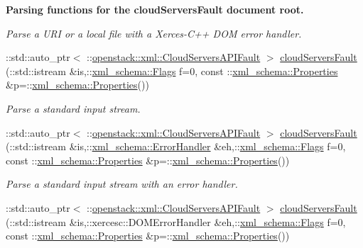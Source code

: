 \begin{Indent}{\bf Parsing functions for the cloudServersFault document root.}
\begin{DoxyCompactItemize}
\begin{DoxyCompactList}\small\item\em Parse a URI or a local file with a Xerces-\/C++ DOM error handler. \item\end{DoxyCompactList}\item 
::std::auto\_\-ptr$<$ ::\hyperlink{classopenstack_1_1xml_1_1CloudServersAPIFault}{openstack::xml::CloudServersAPIFault} $>$ \hyperlink{namespaceopenstack_1_1xml_a111c5cf6fea4d40a87875c2d8cc234f1}{cloudServersFault} (::std::istream \&is,::\hyperlink{namespacexml__schema_affb4c227cbd9aa7453dd1dc5a1401943}{xml\_\-schema::Flags} f=0, const ::\hyperlink{namespacexml__schema_ad27ce19a7ee1d3b1064092648898f64c}{xml\_\-schema::Properties} \&p=::\hyperlink{namespacexml__schema_ad27ce19a7ee1d3b1064092648898f64c}{xml\_\-schema::Properties}())
\begin{DoxyCompactList}\small\item\em Parse a standard input stream. \item\end{DoxyCompactList}\item 
::std::auto\_\-ptr$<$ ::\hyperlink{classopenstack_1_1xml_1_1CloudServersAPIFault}{openstack::xml::CloudServersAPIFault} $>$ \hyperlink{namespaceopenstack_1_1xml_a230d02d53deb3a8712f67f44f72def1c}{cloudServersFault} (::std::istream \&is,::\hyperlink{namespacexml__schema_ab1c9361bfd3b404eaabf0c31eded79dc}{xml\_\-schema::ErrorHandler} \&eh,::\hyperlink{namespacexml__schema_affb4c227cbd9aa7453dd1dc5a1401943}{xml\_\-schema::Flags} f=0, const ::\hyperlink{namespacexml__schema_ad27ce19a7ee1d3b1064092648898f64c}{xml\_\-schema::Properties} \&p=::\hyperlink{namespacexml__schema_ad27ce19a7ee1d3b1064092648898f64c}{xml\_\-schema::Properties}())
\begin{DoxyCompactList}\small\item\em Parse a standard input stream with an error handler. \item\end{DoxyCompactList}\item 
::std::auto\_\-ptr$<$ ::\hyperlink{classopenstack_1_1xml_1_1CloudServersAPIFault}{openstack::xml::CloudServersAPIFault} $>$ \hyperlink{namespaceopenstack_1_1xml_a11859017418614472cc3e93af301c76b}{cloudServersFault} (::std::istream \&is,::xercesc::DOMErrorHandler \&eh,::\hyperlink{namespacexml__schema_affb4c227cbd9aa7453dd1dc5a1401943}{xml\_\-schema::Flags} f=0, const ::\hyperlink{namespacexml__schema_ad27ce19a7ee1d3b1064092648898f64c}{xml\_\-schema::Properties} \&p=::\hyperlink{namespacexml__schema_ad27ce19a7ee1d3b1064092648898f64c}{xml\_\-schema::Properties}())

\end{DoxyCompactItemize}
\end{Indent}
